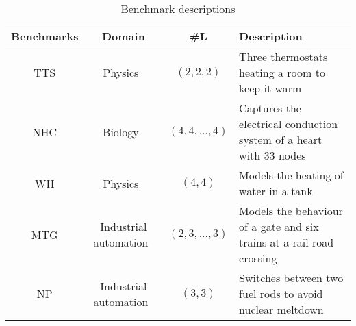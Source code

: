 \begin{table*}
	\centering
	\caption{Benchmark descriptions
	\label{tab:benchmarks}}
\begin{tabular}{ | c | c | c | l | } \hline
\textbf{Benchmarks}
	& \textbf{Domain} 
	& \textbf{\#L } 
	& \textbf{Description} \\ \hline

	\acf{TTS}
		& Physics~\cite{Pedro2005}
		& $(2, 2, 2)$
		& Three thermostats heating a room to keep it warm\\ \hline
		
	\acf{NHC}
		& Biology~\cite{chen201487}
		& $(4, 4, ..., 4)$
		& Captures the electrical conduction system of a heart with 33 nodes\\ \hline

	\acf{WH}
		& Physics~\cite{raskin05}
		& $(4, 4)$
		& Models the heating of water in a tank \\ \hline
		
	\acf{MTG}  
		& Industrial automation~\cite{Costello2013}
		& $(2, 3, ..., 3)$
		& Models the behaviour of a gate and six trains at a rail road crossing\\ \hline
		
	\acf{NP}
		& Industrial automation~\cite{alur2015book}
		& $(3, 3)$
		& Switches between two fuel rods to avoid nuclear meltdown\\ \hline
	
	
 \end{tabular}
 \end{table*}